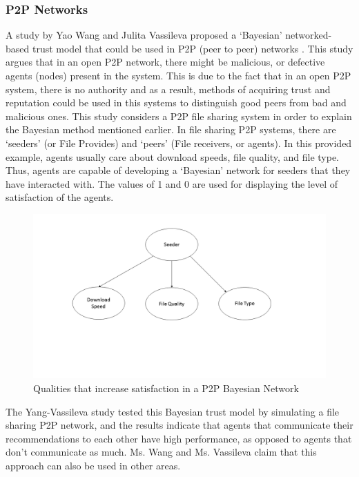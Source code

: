 \documentclass[runningheads,a4paper]{llncs}
\begin{document}
\subsubsection{P2P Networks}
A study by Yao Wang and Julita Vassileva proposed a `Bayesian' networked-based trust model that could be used in P2P (peer to peer) networks \cite{wang2003bayesian}. This study argues that in an open P2P network, there might be malicious, or defective agents (nodes) present in the system. This is due to the fact that in an open P2P system, there is no authority and as a result, methods of acquiring trust and reputation could be used in this systems to distinguish good peers from bad and malicious ones. This study considers a P2P file sharing system in order to explain the Bayesian method mentioned earlier. In file sharing P2P systems, there are `seeders' (or File Provides) and `peers' (File receivers, or agents). In this provided example, agents usually care about download speeds, file quality, and file type. Thus, agents are capable of developing a `Bayesian' network for seeders that they have interacted with. The values of 1 and 0 are used for displaying the level of satisfaction of the agents.

\begin{figure}
	\centering
		\includegraphics[width=\textwidth]{Figures/p2pTrust.png}
	\caption{Qualities that increase satisfaction in a P2P Bayesian Network}
\end{figure}

The Yang-Vassileva study tested this Bayesian trust model by simulating a file sharing P2P network, and the results indicate that agents that communicate their recommendations to each other have high performance, as opposed to agents that don't communicate as much. Ms. Wang and Ms. Vassileva claim that this approach can also be used in other areas.
\end{document}
